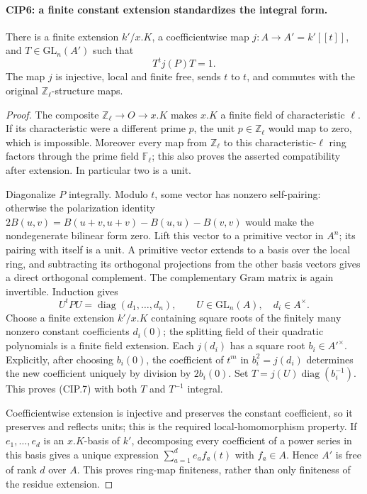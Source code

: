 \paragraph{CIP6: a finite constant extension standardizes the integral form.}
\label{claim:CIP6}
There is a finite extension $k'/x.K$, a coefficientwise map
$j:A\to A'=k'[[t]]$, and $T\in\mathrm{GL}_n(A')$ such that
\[
  T^t j(P)T=1.                                      \tag{CIP.7}
\]
The map $j$ is injective, local and finite free, sends $t$ to $t$,
and commutes with the original $\mathbb Z_\ell$-structure maps.
\begin{proof}
The composite $\mathbb Z_\ell\to O\to x.K$ makes $x.K$ a finite
field of characteristic $\ell$.  If its characteristic were a
different prime $p$, the unit $p\in\mathbb Z_\ell$ would map to
zero, which is impossible.  Moreover every map from
$\mathbb Z_\ell$ to this characteristic-$\ell$ ring factors
through the prime field $\mathbb F_\ell$; this also proves the
asserted compatibility after extension.  In particular two is a
unit.

Diagonalize $P$ integrally.  Modulo $t$, some vector has nonzero
self-pairing: otherwise the polarization identity
$2B(u,v)=B(u+v,u+v)-B(u,u)-B(v,v)$ would make the nondegenerate
bilinear form zero.  Lift this vector to a primitive vector in
$A^n$; its pairing with itself is a unit.  A primitive vector
extends to a basis over the local ring, and subtracting its
orthogonal projections from the other basis vectors gives a direct
orthogonal complement.  The complementary Gram matrix is again
invertible.  Induction gives
\[
 U^tPU=\operatorname{diag}(d_1,\ldots,d_n),\qquad
 U\in\mathrm{GL}_n(A),\quad d_i\in A^\times.
\]
Choose a finite extension $k'/x.K$ containing square roots of the
finitely many nonzero constant coefficients $d_i(0)$; the splitting
field of their quadratic polynomials is a finite field extension.
Each $j(d_i)$ has a square root $b_i\in A'^\times$.  Explicitly,
after choosing $b_i(0)$, the coefficient of $t^m$ in
$b_i^2=j(d_i)$ determines the new coefficient uniquely by division
by $2b_i(0)$.  Set $T=j(U)\operatorname{diag}(b_i^{-1})$.
This proves (CIP.7) with both $T$ and $T^{-1}$ integral.

Coefficientwise extension is injective and preserves the constant
coefficient, so it preserves and reflects units; this is the
required local-homomorphism property.  If $e_1,\ldots,e_d$ is an
$x.K$-basis of $k'$, decomposing every coefficient of a power series
in this basis gives a unique expression
$\sum_{a=1}^d e_a f_a(t)$ with $f_a\in A$.
Hence $A'$ is free of rank $d$ over $A$.  This proves ring-map
finiteness, rather than only finiteness of the residue extension.
\end{proof}

